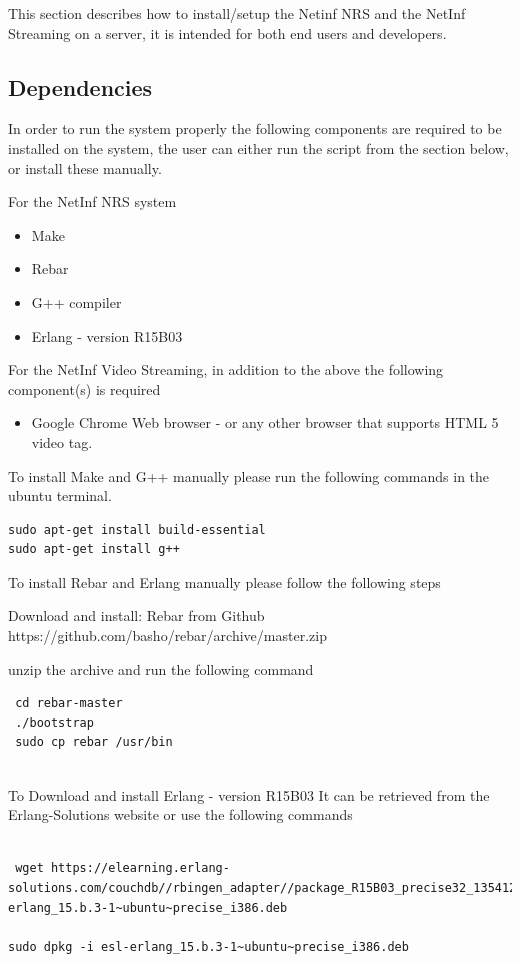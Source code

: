 This section describes how to install/setup the Netinf NRS and the NetInf Streaming on a server, it is intended for both end users and developers.

\subsection{Dependencies}

In order to run the system properly the following components are required to be installed on the system, the user can either run the script from the section below, or install these manually.

For the NetInf NRS system
\begin{itemize}
\item Make
\item Rebar
\item G++ compiler
\item Erlang - version R15B03
\end{itemize}

For the NetInf Video Streaming, in addition to the above the following component(s) is required
\begin{itemize}
\item Google Chrome Web browser - or any other browser that supports HTML 5 video tag.
\end{itemize}

To install Make and G++ manually please run the following commands in the ubuntu terminal.
\begin{verbatim}
sudo apt-get install build-essential
sudo apt-get install g++
\end{verbatim}

To install Rebar and Erlang manually please follow the following steps

Download and install: Rebar from Github
https://github.com/basho/rebar/archive/master.zip

unzip the archive and run the following command
\begin{verbatim}
 cd rebar-master
 ./bootstrap
 sudo cp rebar /usr/bin
 
\end{verbatim}

To Download and install Erlang - version R15B03
It can be retrieved from the Erlang-Solutions website or use the following commands

\begin{verbatim}

 wget https://elearning.erlang-solutions.com/couchdb//rbingen_adapter//package_R15B03_precise32_1354121173/esl-erlang_15.b.3-1~ubuntu~precise_i386.deb
 
sudo dpkg -i esl-erlang_15.b.3-1~ubuntu~precise_i386.deb

\end{verbatim}

